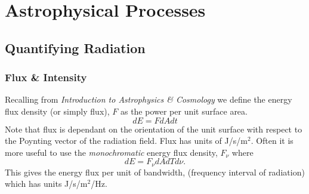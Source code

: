 \chapter{Astrophysical Processes}
\minitoc
\section{Quantifying Radiation}
\subsection{Flux \& Intensity}
Recalling from \textit{Introduction to Astrophysics \& Cosmology} we define the energy flux density (or simply flux), $F$ as the power per unit surface area.
%
$$ dE = FdAdt $$
%
Note that flux is dependant on the orientation of the unit surface with respect to the Poynting vector of the radiation field.
 Flux has units of J/s/m$^2$.
 Often it is more useful to use the \emph{monochromatic} energy flux density, $F_\nu$ where
%
$$ dE = F_\nu dAdTd\nu. $$
%
This gives the energy flux per unit of bandwidth, (frequency interval of radiation) which has units J/s/m$^2$/Hz.